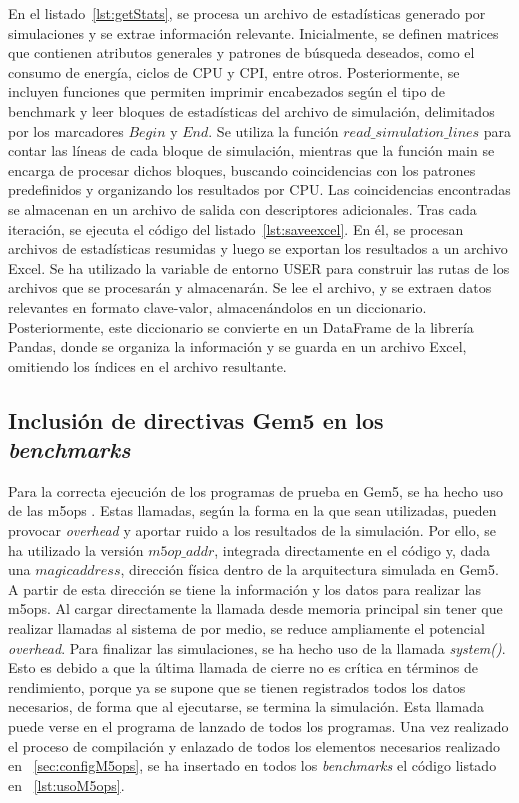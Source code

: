 En el listado~\ref{lst:getStats}, se procesa un archivo de estadísticas generado por simulaciones y se extrae información relevante. Inicialmente, se definen matrices que contienen atributos generales y patrones de búsqueda deseados, como el consumo de energía, ciclos de \ac{CPU} y \ac{CPI}, entre otros. Posteriormente, se incluyen funciones que permiten imprimir encabezados según el tipo de benchmark y leer bloques de estadísticas del archivo de simulación, delimitados por los marcadores $Begin$ y $End$. Se utiliza la función $read\_simulation\_lines$ para contar las líneas de cada bloque de simulación, mientras que la función main se encarga de procesar dichos bloques, buscando coincidencias con los patrones predefinidos y organizando los resultados por CPU. Las coincidencias encontradas se almacenan en un archivo de salida con descriptores adicionales. Tras cada iteración, se ejecuta el código del listado~\ref{lst:saveexcel}. En él, se procesan archivos de estadísticas resumidas y luego se exportan los resultados a un archivo Excel. Se ha utilizado la variable de entorno USER para construir las rutas de los archivos que se procesarán y almacenarán. Se lee el archivo, y se extraen datos relevantes en formato clave-valor, almacenándolos en un diccionario. Posteriormente, este diccionario se convierte en un DataFrame de la librería Pandas, donde se organiza la información y se guarda en un archivo Excel, omitiendo los índices en el archivo resultante.

\subsection{Inclusión de directivas Gem5 en los \textit{benchmarks}}
\label{subs:usoGem5}

Para la correcta ejecución de los programas de prueba en Gem5, se ha hecho uso de las m5ops \cite{m5ops-documentacion} \cite{m5ops-documentacion2}. Estas llamadas, según la forma en la que sean utilizadas, pueden provocar \textit{overhead} y aportar ruido a los resultados de la simulación. Por ello, se ha utilizado la versión $m5op\_addr$, integrada directamente en el código y, dada una $magic address$, dirección física dentro de la arquitectura simulada en Gem5. A partir de esta dirección se tiene la información y los datos para realizar las m5ops. Al cargar directamente la llamada desde memoria principal sin tener que realizar llamadas al sistema de por medio, se reduce ampliamente el potencial \textit{overhead}. Para finalizar las simulaciones, se ha hecho uso de la llamada \textit{system()}. Esto es debido a que la última llamada de cierre no es crítica en términos de rendimiento, porque ya se supone que se tienen registrados todos los datos necesarios, de forma que al ejecutarse, se termina la simulación. Esta llamada puede verse en el programa de lanzado de todos los programas. Una vez realizado el proceso de compilación y enlazado de todos los elementos necesarios realizado en ~\ref{sec:configM5ops}, se ha insertado en todos los \textit{benchmarks} el código listado en ~\ref{lst:usoM5ops}. 


